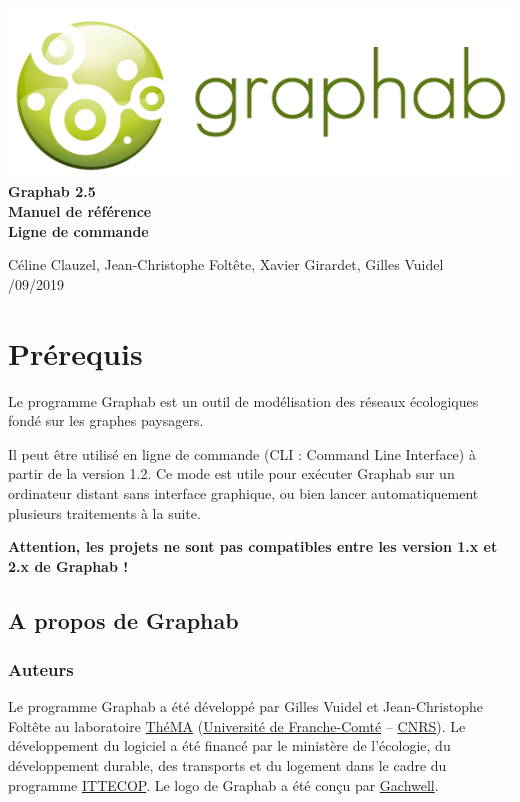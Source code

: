 \documentclass[a4paper,10pt]{report}
\begin{document}
 \begin{titlepage}
 	
 	\centering
 	\includegraphics[scale=0.5]{img/logo.png}\\
 	
 	\bigskip
 	\bigskip
 	\bigskip	
 	{\Huge
 		\bfseries
 		Graphab 2.5\\
 		\bigskip
 		Manuel de référence\\
 		Ligne de commande\\
 	}
 	\bigskip
 	\bigskip
 	\bigskip
 	\bigskip
 	\bigskip
 	
 	{\Large		
 		Céline Clauzel, Jean-Christophe Foltête, Xavier Girardet, Gilles Vuidel\\
 		/09/2019\\
 	}
 	
 \end{titlepage}




\tableofcontents

\chapter{Prérequis}

Le programme Graphab est un outil de modélisation des réseaux écologiques fondé sur les graphes paysagers.

Il peut être utilisé en ligne de commande (CLI : Command Line Interface) à partir de la version 1.2. Ce mode est utile pour exécuter Graphab sur un ordinateur distant sans interface graphique, ou bien lancer automatiquement plusieurs traitements à la suite.

\textbf{Attention, les projets ne sont pas compatibles entre les version 1.x et 2.x de Graphab !}

\section{A propos de Graphab}

\subsection{Auteurs}
Le programme Graphab a été développé par Gilles Vuidel et Jean-Christophe Foltête au laboratoire \href{http://thema.univ-fcomte.fr}{ThéMA} (\href{http://www.univ-fcomte.fr}{Université de Franche-Comté} – \href{http://www.cnrs.fr}{CNRS}). Le développement du logiciel a été financé par le ministère de l'écologie, du développement durable, des transports et du logement dans le cadre du programme \href{http://www.ittecop.fr/}{ITTECOP}. Le logo de Graphab a été conçu par \href{http://www.gachwell.com/}{Gachwell}. 
\end{document}
